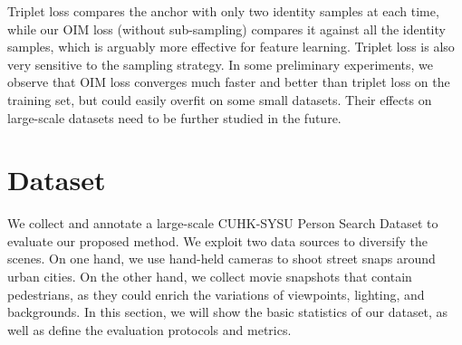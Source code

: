 {Triplet loss compares the anchor with only two identity samples at each time, while our OIM loss (without sub-sampling) compares it against all the identity samples, which is arguably more effective for feature learning. Triplet loss is also very sensitive to the sampling strategy. In some preliminary experiments, we observe that OIM loss converges much faster and better than triplet loss on the training set, but could easily overfit on some small datasets. Their effects on large-scale datasets need to be further studied in the future.}


\section{Dataset} %
\label{sec:ps-dataset}
We collect and annotate a large-scale CUHK-SYSU Person Search Dataset to evaluate our proposed method. We exploit two data sources to diversify the scenes. On one hand, we use hand-held cameras to shoot street snaps around urban cities. On the other hand, we collect movie snapshots that contain pedestrians, as they could enrich the variations of viewpoints, lighting, and backgrounds. In this section, we will show the basic statistics of our dataset, as well as define the evaluation protocols and metrics.

